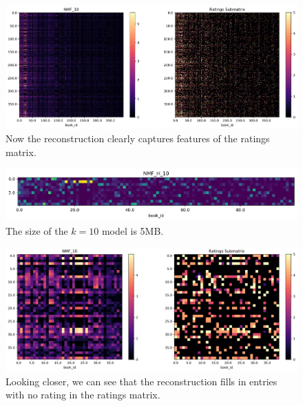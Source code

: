 \documentclass[11pt]{article}
\begin{document}
\begin{figure}
    \centering
    \includegraphics[width=\linewidth]{../image/goodreads-models/nmf-10-left.png}
    \caption[NMF-10-Left]{Now the reconstruction clearly captures features of the ratings matrix.}
     \label{fig:nmf-10-left}
\end{figure}


\begin{figure}[p]
    \centering
    \includegraphics[width=\textwidth, trim=3cm 0cm 0cm 0cm, clip]{../image/goodreads-models/nmf-H-10.png}
    \caption[NMF-H-10]{The size of the $k=10$ model is 5MB.}
     \label{fig:nmf-H-10}
\end{figure}



\begin{figure}[p]
    \centering
    \includegraphics[width=\linewidth]{../image/goodreads-models/nmf-10-left-close.png}
    \caption[NMF-10-Left-Close]{Looking closer, we can see that the reconstruction fills in entries with no rating in the ratings matrix.}
     \label{fig:nmf-10-left-close}
\end{figure}
\end{document}
